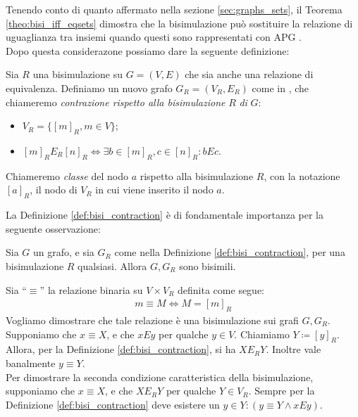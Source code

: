 Tenendo conto di quanto affermato nella sezione \ref{sec:graphs_sets}, il Teorema \ref{theo:bisi_iff_eqsets} dimostra che la bisimulazione può sostituire la
relazione di uguaglianza tra insiemi quando questi sono rappresentati con APG \cite{dovier}.\\

Dopo questa considerazone possiamo dare la seguente definizione:
\begin{definition}
    \label{def:bisi_contraction}
    Sia $R$ una bisimulazione su $G = (V,E)$ che sia anche una relazione di equivalenza. Definiamo un nuovo grafo $G_R = (V_R, E_R)$ come in \cite{gentilini}, che chiameremo \emph{contrazione rispetto alla bisimulazione} $R$ \emph{di} $G$:
    \begin{itemize}
        \item $V_R = \{[m]_R, m \in V\}$;
        \item $[m]_R E_R [n]_R \iff \exists b \in [m]_R, c \in [n]_R : b E c$.
    \end{itemize}
    Chiameremo \emph{classe} del nodo $a$ rispetto alla bisimulazione $R$, con la notazione $[a]_R$, il nodo di $V_R$ in cui viene inserito il nodo $a$.
\end{definition}
La Definizione \ref{def:bisi_contraction} è di fondamentale importanza per la seguente osservazione:
\begin{proposition}
    Sia $G$ un grafo, e sia $G_R$ come nella Definizione \ref{def:bisi_contraction}, per una bisimulazione $R$ qualsiasi. Allora $G, G_R$ sono bisimili.
    \label{prop:bisi_cont_bisi}
\end{proposition}
\begin{proof2}
    Sia ``$\equiv$'' la relazione binaria su $V\times V_R$ definita come segue:
    \begin{gather*}
        m \equiv M \iff M = [m]_R
    \end{gather*}
    Vogliamo dimostrare che tale relazione è una bisimulazione sui grafi $G, G_R$.\\
    Supponiamo che $x \equiv X$, e che $x E y$ per qualche $y \in V$. Chiamiamo $Y \coloneqq [y]_R$. Allora, per la Definizione \ref{def:bisi_contraction}, si ha $X E_R Y$. Inoltre vale banalmente $y \equiv Y$.\\
    Per dimostrare la seconda condizione caratteristica della bisimulazione, supponiamo che $x \equiv X$, e che $X E_R Y$ per qualche $Y \in V_R$. Sempre per la Definizione \ref{def:bisi_contraction} deve esistere un $y \in Y : (y \equiv Y \land x E y)$.
\end{proof2}
